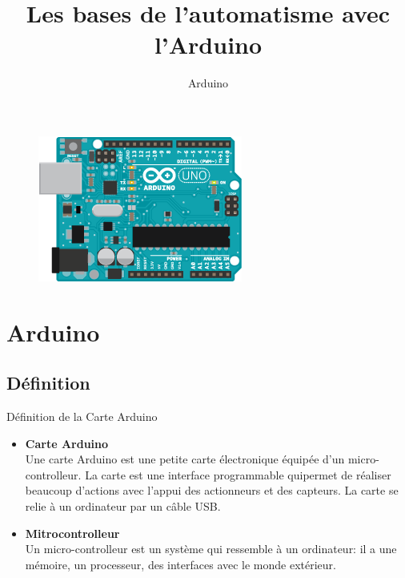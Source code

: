\documentclass[]{beamer}
\title[Arduino]{Les bases de l'automatisme avec l'Arduino}
\author[Michel Nassalang]{}
\institute[IPSL]{
Lycée Amadou Sow Ndiaye}
\date[]{Arduino}
\begin{document}
	\begin{frame}
		\titlepage		
		\begin{figure}
			\begin{center}
				\includegraphics[scale=0.5]{arduino.png}
			\end{center}
		\end{figure}
	\end{frame}
	\section{Arduino}
	\subsection{Définition}
	\begin{frame}
	{Définition de la Carte Arduino}
	\begin{itemize}
	\item \textbf{Carte Arduino}
	 \\Une carte Arduino est une petite carte électronique 				équipée d'un micro-controlleur. La carte est une interface  				programmable quipermet de réaliser beaucoup d'actions avec 				l'appui des actionneurs et des capteurs. La carte se relie à un 		ordinateur par un câble USB.
	\item \textbf{Mitrocontrolleur}
	  \\Un micro-controlleur est un système qui ressemble à un 		ordinateur: il a une mémoire, un processeur, des interfaces 				avec le monde extérieur.
	\end{itemize}
	\end{frame}
\end{document}
